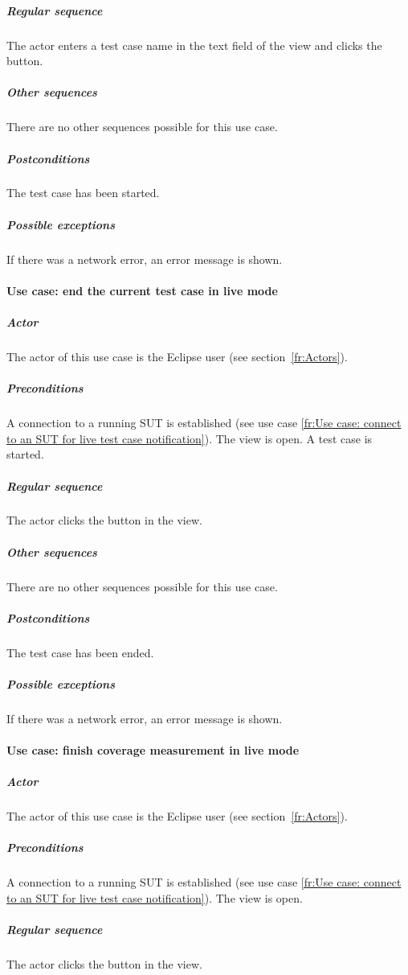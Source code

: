\subparagraph{Regular sequence} The actor enters a test case name in
the text field of the view and clicks the  button.

\subparagraph{Other sequences}
There are no other sequences possible for this use case.

\subparagraph{Postconditions}
The test case has been started.

\subparagraph{Possible exceptions}
If there was a network error, an error message is shown.

\paragraph{Use case: end the current test case in live mode} \label{fr:Use case: end the current test case in live mode}

\subparagraph{Actor} The actor of this use case is the Eclipse user
(see section~\ref{fr:Actors}).

\subparagraph{Preconditions} A connection to a running SUT is
established (see use case \ref{fr:Use case: connect to an SUT for live
  test case notification}). The  view is
open. A test case is started.

\subparagraph{Regular sequence} The actor clicks the 
button in the  view.

\subparagraph{Other sequences}
There are no other sequences possible for this use case.

\subparagraph{Postconditions}
The test case has been ended.

\subparagraph{Possible exceptions}
If there was a network error, an error message is shown.

\paragraph{Use case: finish coverage measurement in live mode} \label{fr:Use case: finish coverage measurement in live mode}

\subparagraph{Actor} The actor of this use case is the Eclipse user
(see section~\ref{fr:Actors}).

\subparagraph{Preconditions} A connection to a running SUT is
established (see use case \ref{fr:Use case: connect to an SUT for live
  test case notification}). The  view is
open.

\subparagraph{Regular sequence} The actor clicks the 
button in the  view.

